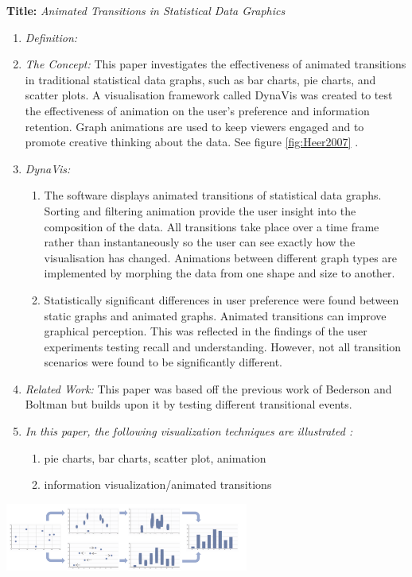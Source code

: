 \documentclass{egpubl}
\begin{document}
\textbf{Title:} \textit{Animated Transitions in Statistical Data Graphics}
\begin{enumerate}
\item \textit{Definition:} 
\item \textit{The Concept:} This paper investigates the effectiveness of animated transitions in traditional statistical data graphs, such as bar charts, pie charts, and scatter plots. A visualisation framework called DynaVis was created to test the effectiveness of animation on the user's preference and information retention. Graph animations are used to keep viewers engaged and to promote creative thinking about the data. See figure \ref{fig:Heer2007} \cite{heer2007}.
\item  \textit{DynaVis:} 
\begin{enumerate}
\item The software displays animated transitions of statistical data graphs. Sorting and filtering animation provide the user insight into the composition of the data. All transitions take place over a time frame rather than instantaneously so the user can see exactly how the visualisation has changed. Animations between different graph types are implemented by morphing the data from one shape and size to another.
\item Statistically significant differences in user preference were found between static graphs and animated graphs. Animated transitions can improve graphical perception. This was reflected in the findings of the user experiments testing recall and understanding. However, not all transition scenarios were found to be significantly different.
\end{enumerate}
\item \textit{Related Work:}  This paper was based off the previous work of Bederson and Boltman \cite{bedrson} but builds upon it by testing different transitional events.
\item \textit{In this paper, the following visualization techniques are illustrated :} 
\begin{enumerate}
\item pie charts, bar charts, scatter plot, animation
\item information visualization/animated transitions
\end{enumerate}
\end{enumerate}

\begingroup
\centering
\includegraphics[width=8cm]{./images/AnimatedTransitions}
\label{fig:Heer2007}
\endgroup
\end{document}
